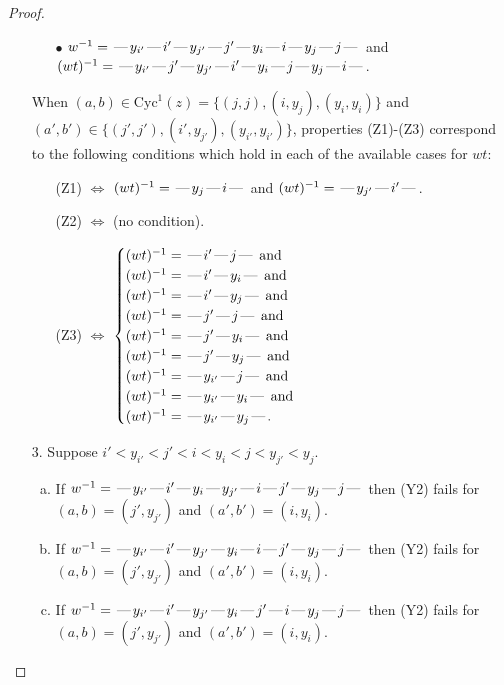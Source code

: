 \documentclass[10pt]{article}
\theoremstyle{definition}
\theoremstyle{definition}
\def\dash{\text{\hspace{0.5mm}---\hspace{0.5mm}}}
\def\Cyc{\mathrm{Cyc}}
\begin{document}
\begin{proof}
\begin{enumerate}
\begin{enumerate}
\item[$\bullet$] $w^{-1} = \dash y_{i'}\dash i'\dash y_{j'}\dash j'\dash y_i\dash i\dash y_j\dash j\dash $ and $(wt)^{-1} = \dash y_{i'}\dash j'\dash y_{j'}\dash i'\dash y_i\dash j\dash y_j\dash i\dash $.
\end{enumerate}
When $(a,b)\in\Cyc^1(z)=\{(j,j),(i,y_j),(y_i,y_i)\}$ and $(a',b')\in\{(j',j'),(i',y_{j'}),(y_{i'},y_{i'})\}$,
properties (Z1)-(Z3) correspond to the following conditions which
hold in each of the available cases for $wt$:
\begin{enumerate}
\item[](Z1) $\Leftrightarrow$ $(wt)^{-1} = \dash y_j \dash i \dash$  and $(wt)^{-1} = \dash y_{j'} \dash i' \dash$.
\item[](Z2) $\Leftrightarrow$ (no condition).
\item[](Z3) $\Leftrightarrow$ $\begin{cases}\text{$(wt)^{-1} = \dash i' \dash j \dash$}\text{ and }\\
\text{$(wt)^{-1} = \dash i' \dash y_i \dash$}\text{ and }\\
\text{$(wt)^{-1} = \dash i' \dash y_j \dash$}\text{ and }\\
\text{$(wt)^{-1} = \dash j' \dash j \dash$}\text{ and }\\
\text{$(wt)^{-1} = \dash j' \dash y_i \dash$}\text{ and }\\
\text{$(wt)^{-1} = \dash j' \dash y_j \dash$}\text{ and }\\
\text{$(wt)^{-1} = \dash y_{i'} \dash j \dash$}\text{ and }\\
\text{$(wt)^{-1} = \dash y_{i'} \dash y_i \dash$}\text{ and }\\
\text{$(wt)^{-1} = \dash y_{i'} \dash y_j \dash$}.\end{cases}$
\end{enumerate}
\item[$3$.] Suppose $i' < y_{i'} < j' < i < y_i < j < y_{j'} < y_j$.
\begin{enumerate}[(a)]
\item If $w^{-1} = \dash y_{i'}\dash i'\dash y_i\dash y_{j'}\dash i\dash j'\dash y_j\dash j\dash $ then (Y2) fails for $(a,b)=(j',y_{j'})$ and $(a',b')=(i,y_i)$.
\item If $w^{-1} = \dash y_{i'}\dash i'\dash y_{j'}\dash y_i\dash i\dash j'\dash y_j\dash j\dash $ then (Y2) fails for $(a,b)=(j',y_{j'})$ and $(a',b')=(i,y_i)$.
\item If $w^{-1} = \dash y_{i'}\dash i'\dash y_{j'}\dash y_i\dash j'\dash i\dash y_j\dash j\dash $ then (Y2) fails for $(a,b)=(j',y_{j'})$ and $(a',b')=(i,y_i)$.

\end{enumerate}
\end{enumerate}
\end{proof}
\end{document}
